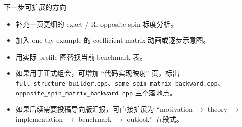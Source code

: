 \documentclass[aspectratio=169,professionalfonts]{ctexbeamer}
\begin{document}
\begin{frame}{下一步可扩展的方向}
  \small
  \begin{itemize}
    \item 补充一页更细的 exact / RI opposite-spin 标度分析。
    \item 加入 one toy example 的 coefficient-matrix 动画或逐步示意图。
    \item 用实际 profile 图替换当前 benchmark 表。
    \item 如果用于正式组会，可增加 “代码实现映射” 页，标出
      \texttt{full\_structure\_builder.cpp}、\texttt{same\_spin\_matrix\_backward.cpp}、
      \texttt{opposite\_spin\_matrix\_backward.cpp} 三个落地点。
    \item 如果后续需要投稿导向版汇报，可直接扩展为
      ``motivation $\rightarrow$ theory $\rightarrow$ implementation
      $\rightarrow$ benchmark $\rightarrow$ outlook'' 五段式。
  \end{itemize}
\end{frame}
\end{document}
